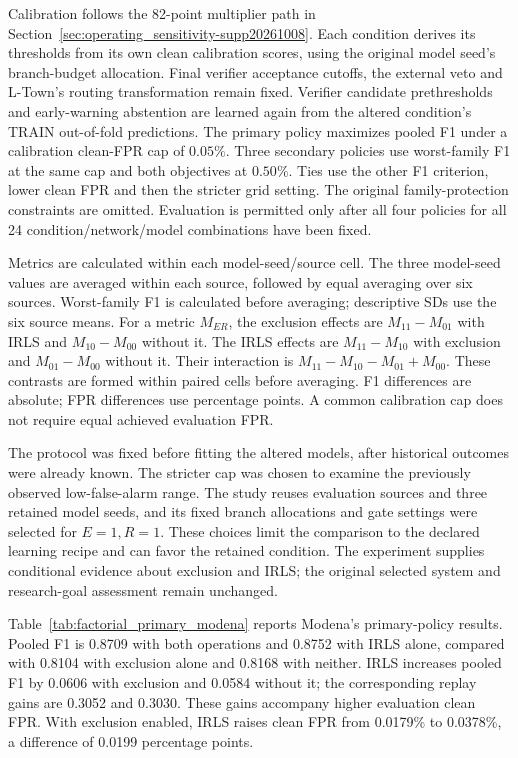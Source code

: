 Calibration follows the 82-point multiplier path in Section~\ref{sec:operating_sensitivity-supp20261008}. Each condition derives its thresholds from its own clean calibration scores, using the original model seed's branch-budget allocation. Final verifier acceptance cutoffs, the external veto and L-Town's routing transformation remain fixed. Verifier candidate prethresholds and early-warning abstention are learned again from the altered condition's TRAIN out-of-fold predictions. The primary policy maximizes pooled F1 under a calibration clean-FPR cap of $0.05\%$. Three secondary policies use worst-family F1 at the same cap and both objectives at $0.50\%$. Ties use the other F1 criterion, lower clean FPR and then the stricter grid setting. The original family-protection constraints are omitted. Evaluation is permitted only after all four policies for all 24 condition/network/model combinations have been fixed.

Metrics are calculated within each model-seed/source cell. The three model-seed values are averaged within each source, followed by equal averaging over six sources. Worst-family F1 is calculated before averaging; descriptive SDs use the six source means. For a metric $M_{ER}$, the exclusion effects are $M_{11}-M_{01}$ with IRLS and $M_{10}-M_{00}$ without it. The IRLS effects are $M_{11}-M_{10}$ with exclusion and $M_{01}-M_{00}$ without it. Their interaction is $M_{11}-M_{10}-M_{01}+M_{00}$. These contrasts are formed within paired cells before averaging. F1 differences are absolute; FPR differences use percentage points. A common calibration cap does not require equal achieved evaluation FPR.

The protocol was fixed before fitting the altered models, after historical outcomes were already known. The stricter cap was chosen to examine the previously observed low-false-alarm range. The study reuses evaluation sources and three retained model seeds, and its fixed branch allocations and gate settings were selected for $E=1,R=1$. These choices limit the comparison to the declared learning recipe and can favor the retained condition. The experiment supplies conditional evidence about exclusion and IRLS; the original selected system and research-goal assessment remain unchanged.

Table~\ref{tab:factorial_primary_modena} reports Modena's primary-policy results. Pooled F1 is 0.8709 with both operations and 0.8752 with IRLS alone, compared with 0.8104 with exclusion alone and 0.8168 with neither. IRLS increases pooled F1 by 0.0606 with exclusion and 0.0584 without it; the corresponding replay gains are 0.3052 and 0.3030. These gains accompany higher evaluation clean FPR. With exclusion enabled, IRLS raises clean FPR from 0.0179\% to 0.0378\%, a difference of 0.0199 percentage points.

